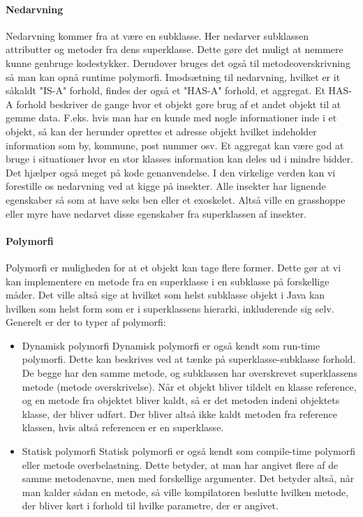     \paragraph{Nedarvning} 
    Nedarvning kommer fra at være en subklasse. Her nedarver subklassen attributter og metoder fra dens superklasse. Dette gøre det muligt at nemmere kunne genbruge kodestykker. Derudover bruges det også til metodeoverskrivning så man kan opnå runtime polymorfi. 
    Imodsætning til nedarvning, hvilket er it såkaldt "IS-A" forhold, findes der også et "HAS-A" forhold, et aggregat.
    Et HAS-A forhold beskriver de gange hvor et objekt gøre brug af et andet objekt til at gemme data. F.eks. hvis man har en kunde med nogle informationer inde i et objekt, så kan der herunder oprettes et adresse objekt hvilket indeholder information som by, kommune, post nummer osv. 
    Et aggregat kan være god at bruge i situationer hvor en stor klasses information kan deles ud i mindre bidder.  Det hjælper også meget på kode genanvendelse.
    I den virkelige verden kan vi forestille os nedarvning ved at kigge på insekter. Alle insekter har lignende egenskaber så som at have seks ben eller et exoskelet. Altså ville en grasshoppe eller myre have nedarvet disse egenskaber fra superklassen af insekter.
    \paragraph{Polymorfi} 
    Polymorfi er muligheden for at et objekt kan tage flere former. Dette gør at vi kan implementere en metode fra en superklasse i en subklasse på forskellige måder. 
    Det ville altså sige at hvilket som helst subklasse objekt i Java kan hvilken som helst form som er i superklassens hierarki, inkluderende sig selv.
    Generelt er der to typer af polymorfi:
    \begin{itemize}
        \item Dynamisk polymorfi 
        \subitem 
        Dynamisk polymorfi er også kendt som run-time polymorfi. Dette kan beskrives ved at tænke på superklasse-subklasse forhold. De begge har den samme metode, og subklassen har overskrevet superklassens metode (metode overskrivelse).
        Når et objekt bliver tildelt en klasse reference, og en metode fra objektet bliver kaldt, så er det metoden indeni objektets klasse, der bliver udført. Der bliver altså ikke kaldt metoden fra reference klassen, hvis altså referencen er en superklasse. %
        \item Statisk polymorfi 
        \subitem Statisk polymorfi er  også kendt som compile-time polymorfi eller metode overbelastning. Dette betyder, at man har angivet flere af de samme metodenavne, men med forskellige argumenter. Det betyder altså, når man kalder sådan en metode, så ville kompilatoren beslutte hvilken metode, der bliver kørt i forhold til hvilke parametre, der er angivet.
    \end{itemize}
    
